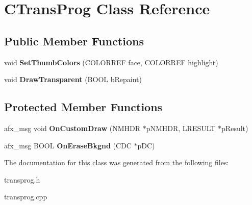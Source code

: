 \hypertarget{class_c_trans_prog}{\section{C\-Trans\-Prog Class Reference}
\label{class_c_trans_prog}
}
\subsection*{Public Member Functions}
\begin{DoxyCompactItemize}
\item 
\hypertarget{class_c_trans_prog_acf82b709c07b0a52be474a75d6ea9b4f}{void {\bfseries Set\-Thumb\-Colors} (C\-O\-L\-O\-R\-R\-E\-F face, C\-O\-L\-O\-R\-R\-E\-F highlight)}\label{class_c_trans_prog_acf82b709c07b0a52be474a75d6ea9b4f}

\item 
\hypertarget{class_c_trans_prog_a06b218139396e35223f8ca4e0276b9e4}{void {\bfseries Draw\-Transparent} (B\-O\-O\-L b\-Repaint)}\label{class_c_trans_prog_a06b218139396e35223f8ca4e0276b9e4}

\end{DoxyCompactItemize}
\subsection*{Protected Member Functions}
\begin{DoxyCompactItemize}
\item 
\hypertarget{class_c_trans_prog_a41d798eb4804491cde61784f768611b7}{afx\-\_\-msg void {\bfseries On\-Custom\-Draw} (N\-M\-H\-D\-R $\ast$p\-N\-M\-H\-D\-R, L\-R\-E\-S\-U\-L\-T $\ast$p\-Result)}\label{class_c_trans_prog_a41d798eb4804491cde61784f768611b7}

\item 
\hypertarget{class_c_trans_prog_a122d340738440c6af0be83cbfd6f271e}{afx\-\_\-msg B\-O\-O\-L {\bfseries On\-Erase\-Bkgnd} (C\-D\-C $\ast$p\-D\-C)}\label{class_c_trans_prog_a122d340738440c6af0be83cbfd6f271e}

\end{DoxyCompactItemize}


The documentation for this class was generated from the following files\-:\begin{DoxyCompactItemize}
\item 
transprog.\-h\item 
transprog.\-cpp\end{DoxyCompactItemize}
